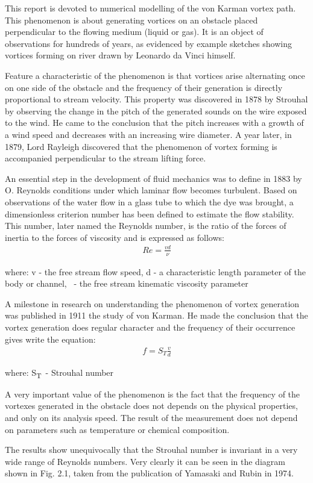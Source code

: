 \documentclass[a4paper,11pt]{article}
\begin{document}
This report is devoted to numerical modelling of the von Karman vortex path. This phenomenon is about generating vortices on an obstacle placed perpendicular to the flowing medium (liquid or gas). It is an object of observations for hundreds of years, as evidenced by example sketches showing vortices forming on
river drawn by Leonardo da Vinci himself. \par			Feature a characteristic of the phenomenon is that vortices arise alternating once on one side of the obstacle and the frequency of their generation is directly proportional to stream velocity. This property was discovered in 1878 by Strouhal by observing the change in the pitch of the generated sounds on the wire exposed to the wind. He came to
the conclusion that the pitch increases with a growth of a wind speed and decreases with an increasing wire diameter. A year later, in 1879, Lord Rayleigh discovered that the phenomenon of vortex forming is accompanied perpendicular to the stream
lifting force.\par
	An essential step in the development of fluid mechanics
was to define in 1883 by O. Reynolds
conditions under which laminar flow becomes
turbulent. Based on observations of the water flow in a glass tube to which the dye was brought, a dimensionless criterion number has been defined
to estimate the flow stability. This number,
later named the Reynolds number, is the ratio of the forces of inertia to the forces of viscosity and is expressed as follows:
\begin{gather*}
    Re = \frac{vd}{\nu}
\end{gather*}

\noindent where: v - the free stream flow speed,  d - a characteristic length parameter of the body or channel, \textnu \ - the free stream kinematic viscosity parameter

\medskip
 
A milestone in research on understanding
the phenomenon of vortex generation was published in 1911 the study of von Karman. He made the conclusion that the vortex generation does
regular character and the frequency of their occurrence gives write the equation:
\begin{gather*}
    f = S_T\frac{v}{d}
\end{gather*}

\noindent where: S\textsubscript{T}\ - Strouhal number

\medskip
 
A very important value of the phenomenon is the fact that the frequency of the vortexes generated in the obstacle does not depends on the physical properties, and only on its analysis speed. The result of the measurement does not depend on parameters such as temperature or chemical composition.\par
The results show unequivocally that the Strouhal number is invariant in a very wide range of Reynolds numbers. Very clearly it can be seen in the diagram shown in Fig. 2.1, taken from the publication of Yamasaki and Rubin in 1974.
\end{document}
